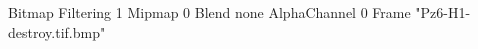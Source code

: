 {Bitmap
	{Filtering 1}
	{Mipmap 0}
	{Blend none}
	{AlphaChannel 0}
	{Frame "Pz6-H1-destroy.tif.bmp"}
}
